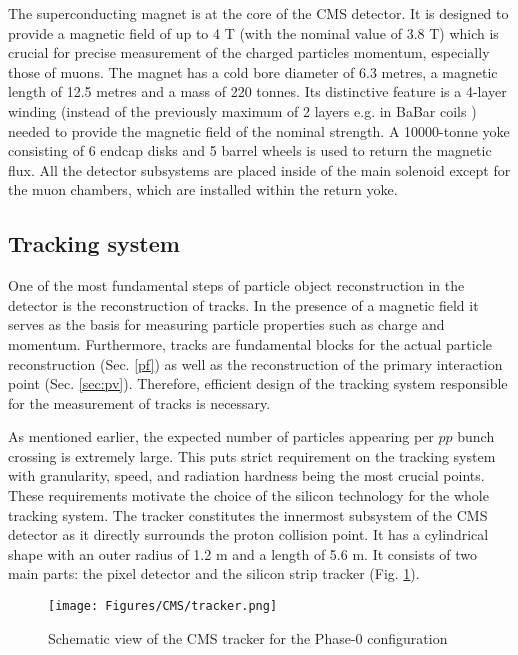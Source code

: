 The superconducting magnet is at the core of the CMS detector. It is designed to provide a magnetic field of up to 4 T (with the nominal value of 3.8 T) which is crucial for precise measurement of the charged particles momentum, especially those of muons. The magnet has a cold bore diameter of 6.3 metres, a magnetic length of 12.5 metres and a mass of 220 tonnes. Its distinctive feature is a 4-layer winding (instead of the previously maximum of 2 layers e.g. in BaBar coils \cite{BaBar:2001yhh}) needed to provide the magnetic field of the nominal strength. A 10000-tonne yoke consisting of 6 endcap disks and 5 barrel wheels is used to return the magnetic flux. All the detector subsystems are placed inside of the main solenoid except for the muon chambers, which are installed within the return yoke.

\subsection{Tracking system}\label{sec:tracker}
One of the most fundamental steps of particle object reconstruction in the detector is the reconstruction of tracks. In the presence of a magnetic field it serves as the basis for measuring particle properties such as charge and momentum. Furthermore, tracks are fundamental blocks for the actual particle reconstruction (Sec. \ref{pf}) as well as the reconstruction of the primary interaction point (Sec. \ref{sec:pv}). Therefore, efficient design of the tracking system responsible for the measurement of tracks is necessary.

As mentioned earlier, the expected number of particles appearing per $pp$ bunch crossing is extremely large. This puts strict requirement on the tracking system with granularity, speed, and radiation hardness being the most crucial points. These requirements motivate the choice of the silicon technology for the whole tracking system. The tracker constitutes the innermost subsystem of the CMS detector as it directly surrounds the proton collision point. It has a cylindrical shape with an outer radius of 1.2 m and a length of 5.6 m. It consists of two main parts: the pixel detector and the silicon strip tracker (Fig. \ref{fig:tracker}). 

\begin{figure}[h!]
    \centering
    \texttt{[image: Figures/CMS/tracker.png]}
    \caption{Schematic view of the CMS tracker for the Phase-0 configuration \cite{CMS:2008xjf}}
    \label{fig:tracker}
\end{figure}

